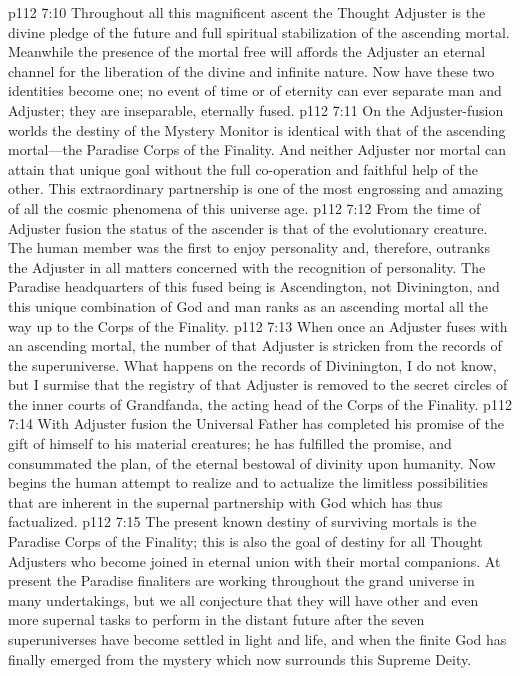 \vs p112 7:10 Throughout all this magnificent ascent the Thought Adjuster is the divine pledge of the future and full spiritual stabilization of the ascending mortal. Meanwhile the presence of the mortal free will affords the Adjuster an eternal channel for the liberation of the divine and infinite nature. Now have these two identities become one; no event of time or of eternity can ever separate man and Adjuster; they are inseparable, eternally fused.
\pc \vs p112 7:11 On the Adjuster\hyp{}fusion worlds the destiny of the Mystery Monitor is identical with that of the ascending mortal---the Paradise Corps of the Finality. And neither Adjuster nor mortal can attain that unique goal without the full co\hyp{}operation and faithful help of the other. This extraordinary partnership is one of the most engrossing and amazing of all the cosmic phenomena of this universe age.
\vs p112 7:12 From the time of Adjuster fusion the status of the ascender is that of the evolutionary creature. The human member was the first to enjoy personality and, therefore, outranks the Adjuster in all matters concerned with the recognition of personality. The Paradise headquarters of this fused being is Ascendington, not Divinington, and this unique combination of God and man ranks as an ascending mortal all the way up to the Corps of the Finality.
\vs p112 7:13 When once an Adjuster fuses with an ascending mortal, the number of that Adjuster is stricken from the records of the superuniverse. What happens on the records of Divinington, I do not know, but I surmise that the registry of that Adjuster is removed to the secret circles of the inner courts of Grandfanda, the acting head of the Corps of the Finality.
\vs p112 7:14 With Adjuster fusion the Universal Father has completed his promise of the gift of himself to his material creatures; he has fulfilled the promise, and consummated the plan, of the eternal bestowal of divinity upon humanity. Now begins the human attempt to realize and to actualize the limitless possibilities that are inherent in the supernal partnership with God which has thus factualized.
\pc \vs p112 7:15 The present known destiny of surviving mortals is the Paradise Corps of the Finality; this is also the goal of destiny for all Thought Adjusters who become joined in eternal union with their mortal companions. At present the Paradise finaliters are working throughout the grand universe in many undertakings, but we all conjecture that they will have other and even more supernal tasks to perform in the distant future after the seven superuniverses have become settled in light and life, and when the finite God has finally emerged from the mystery which now surrounds this Supreme Deity.
